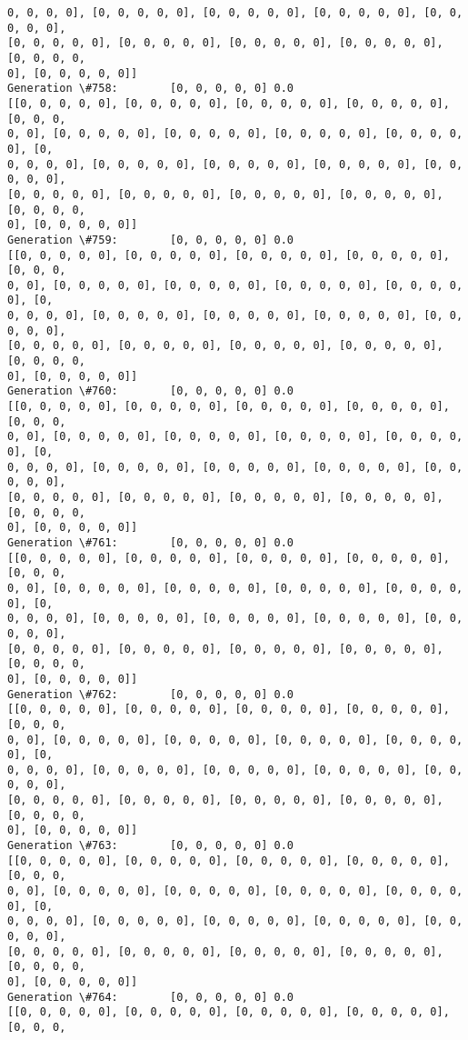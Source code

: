 \documentclass[11pt]{article}
\begin{document}
\begin{Verbatim}[commandchars=\\\{\}]
0, 0, 0, 0], [0, 0, 0, 0, 0], [0, 0, 0, 0, 0], [0, 0, 0, 0, 0], [0, 0, 0, 0, 0],
[0, 0, 0, 0, 0], [0, 0, 0, 0, 0], [0, 0, 0, 0, 0], [0, 0, 0, 0, 0], [0, 0, 0, 0,
0], [0, 0, 0, 0, 0]]
Generation \#758:        [0, 0, 0, 0, 0] 0.0
[[0, 0, 0, 0, 0], [0, 0, 0, 0, 0], [0, 0, 0, 0, 0], [0, 0, 0, 0, 0], [0, 0, 0,
0, 0], [0, 0, 0, 0, 0], [0, 0, 0, 0, 0], [0, 0, 0, 0, 0], [0, 0, 0, 0, 0], [0,
0, 0, 0, 0], [0, 0, 0, 0, 0], [0, 0, 0, 0, 0], [0, 0, 0, 0, 0], [0, 0, 0, 0, 0],
[0, 0, 0, 0, 0], [0, 0, 0, 0, 0], [0, 0, 0, 0, 0], [0, 0, 0, 0, 0], [0, 0, 0, 0,
0], [0, 0, 0, 0, 0]]
Generation \#759:        [0, 0, 0, 0, 0] 0.0
[[0, 0, 0, 0, 0], [0, 0, 0, 0, 0], [0, 0, 0, 0, 0], [0, 0, 0, 0, 0], [0, 0, 0,
0, 0], [0, 0, 0, 0, 0], [0, 0, 0, 0, 0], [0, 0, 0, 0, 0], [0, 0, 0, 0, 0], [0,
0, 0, 0, 0], [0, 0, 0, 0, 0], [0, 0, 0, 0, 0], [0, 0, 0, 0, 0], [0, 0, 0, 0, 0],
[0, 0, 0, 0, 0], [0, 0, 0, 0, 0], [0, 0, 0, 0, 0], [0, 0, 0, 0, 0], [0, 0, 0, 0,
0], [0, 0, 0, 0, 0]]
Generation \#760:        [0, 0, 0, 0, 0] 0.0
[[0, 0, 0, 0, 0], [0, 0, 0, 0, 0], [0, 0, 0, 0, 0], [0, 0, 0, 0, 0], [0, 0, 0,
0, 0], [0, 0, 0, 0, 0], [0, 0, 0, 0, 0], [0, 0, 0, 0, 0], [0, 0, 0, 0, 0], [0,
0, 0, 0, 0], [0, 0, 0, 0, 0], [0, 0, 0, 0, 0], [0, 0, 0, 0, 0], [0, 0, 0, 0, 0],
[0, 0, 0, 0, 0], [0, 0, 0, 0, 0], [0, 0, 0, 0, 0], [0, 0, 0, 0, 0], [0, 0, 0, 0,
0], [0, 0, 0, 0, 0]]
Generation \#761:        [0, 0, 0, 0, 0] 0.0
[[0, 0, 0, 0, 0], [0, 0, 0, 0, 0], [0, 0, 0, 0, 0], [0, 0, 0, 0, 0], [0, 0, 0,
0, 0], [0, 0, 0, 0, 0], [0, 0, 0, 0, 0], [0, 0, 0, 0, 0], [0, 0, 0, 0, 0], [0,
0, 0, 0, 0], [0, 0, 0, 0, 0], [0, 0, 0, 0, 0], [0, 0, 0, 0, 0], [0, 0, 0, 0, 0],
[0, 0, 0, 0, 0], [0, 0, 0, 0, 0], [0, 0, 0, 0, 0], [0, 0, 0, 0, 0], [0, 0, 0, 0,
0], [0, 0, 0, 0, 0]]
Generation \#762:        [0, 0, 0, 0, 0] 0.0
[[0, 0, 0, 0, 0], [0, 0, 0, 0, 0], [0, 0, 0, 0, 0], [0, 0, 0, 0, 0], [0, 0, 0,
0, 0], [0, 0, 0, 0, 0], [0, 0, 0, 0, 0], [0, 0, 0, 0, 0], [0, 0, 0, 0, 0], [0,
0, 0, 0, 0], [0, 0, 0, 0, 0], [0, 0, 0, 0, 0], [0, 0, 0, 0, 0], [0, 0, 0, 0, 0],
[0, 0, 0, 0, 0], [0, 0, 0, 0, 0], [0, 0, 0, 0, 0], [0, 0, 0, 0, 0], [0, 0, 0, 0,
0], [0, 0, 0, 0, 0]]
Generation \#763:        [0, 0, 0, 0, 0] 0.0
[[0, 0, 0, 0, 0], [0, 0, 0, 0, 0], [0, 0, 0, 0, 0], [0, 0, 0, 0, 0], [0, 0, 0,
0, 0], [0, 0, 0, 0, 0], [0, 0, 0, 0, 0], [0, 0, 0, 0, 0], [0, 0, 0, 0, 0], [0,
0, 0, 0, 0], [0, 0, 0, 0, 0], [0, 0, 0, 0, 0], [0, 0, 0, 0, 0], [0, 0, 0, 0, 0],
[0, 0, 0, 0, 0], [0, 0, 0, 0, 0], [0, 0, 0, 0, 0], [0, 0, 0, 0, 0], [0, 0, 0, 0,
0], [0, 0, 0, 0, 0]]
Generation \#764:        [0, 0, 0, 0, 0] 0.0
[[0, 0, 0, 0, 0], [0, 0, 0, 0, 0], [0, 0, 0, 0, 0], [0, 0, 0, 0, 0], [0, 0, 0,

\end{Verbatim}
\end{document}
